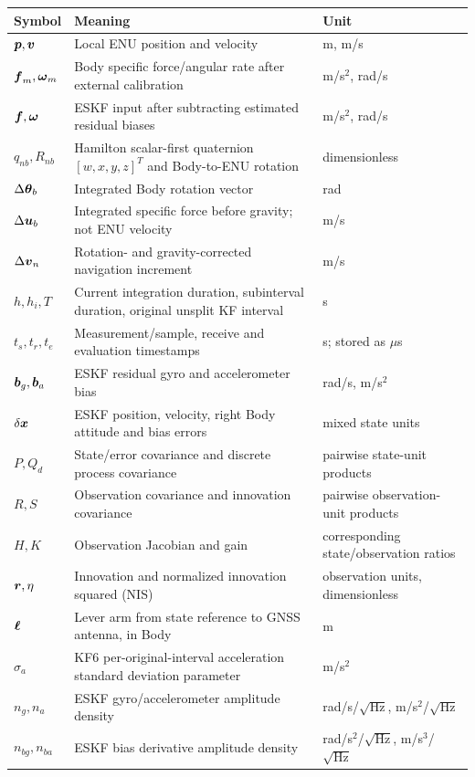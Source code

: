 \begin{small}
\begin{longtable}{@{}L{23mm}L{84mm}L{39mm}@{}}
\toprule Symbol & Meaning & Unit \\
\midrule\endhead
$\boldsymbol{p},\boldsymbol{v}$ & Local ENU position and velocity & m, m/s \\
$\boldsymbol{f}_m,\boldsymbol{\omega}_m$ & Body specific force/angular rate after external calibration & m/s$^2$, rad/s \\
$\boldsymbol{f},\boldsymbol{\omega}$ & ESKF input after subtracting estimated residual biases & m/s$^2$, rad/s \\
$q_{nb},R_{nb}$ & Hamilton scalar-first quaternion $[w,x,y,z]^T$ and Body-to-ENU rotation & dimensionless \\
$\Delta\boldsymbol{\theta}_b$ & Integrated Body rotation vector & rad \\
$\Delta\boldsymbol{u}_b$ & Integrated specific force before gravity; not ENU velocity & m/s \\
$\Delta\boldsymbol{v}_n$ & Rotation- and gravity-corrected navigation increment & m/s \\
$h,h_i,T$ & Current integration duration, subinterval duration, original unsplit KF interval & s \\
$t_s,t_r,t_e$ & Measurement/sample, receive and evaluation timestamps & s; stored as $\mu$s \\
$\boldsymbol{b}_g,\boldsymbol{b}_a$ & ESKF residual gyro and accelerometer bias & rad/s, m/s$^2$ \\
$\delta\boldsymbol{x}$ & ESKF position, velocity, right Body attitude and bias errors & mixed state units \\
$P,Q_d$ & State/error covariance and discrete process covariance & pairwise state-unit products \\
$R,S$ & Observation covariance and innovation covariance & pairwise observation-unit products \\
$H,K$ & Observation Jacobian and gain & corresponding state/observation ratios \\
$\boldsymbol{r},\eta$ & Innovation and normalized innovation squared (NIS) & observation units, dimensionless \\
$\boldsymbol{\ell}$ & Lever arm from state reference to GNSS antenna, in Body & m \\
$\sigma_a$ & KF6 per-original-interval acceleration standard deviation parameter & m/s$^2$ \\
$n_g,n_a$ & ESKF gyro/accelerometer amplitude density & rad/s/$\sqrt{\mathrm{Hz}}$, m/s$^2$/$\sqrt{\mathrm{Hz}}$ \\
$n_{bg},n_{ba}$ & ESKF bias derivative amplitude density & rad/s$^2$/$\sqrt{\mathrm{Hz}}$, m/s$^3$/$\sqrt{\mathrm{Hz}}$ \\
\bottomrule
\end{longtable}
\end{small}

